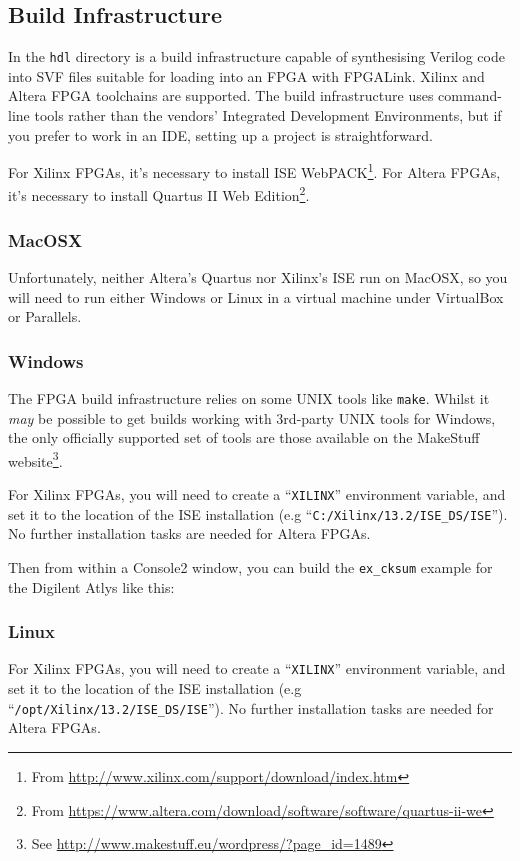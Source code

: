 \subsection{Build Infrastructure}
In the \texttt{hdl} directory is a build infrastructure capable of synthesising Verilog code into SVF files suitable for loading into an FPGA with FPGALink. Xilinx and Altera FPGA toolchains are supported. The build infrastructure uses command-line tools rather than the vendors' Integrated Development Environments, but if you prefer to work in an IDE, setting up a project is straightforward.

For Xilinx FPGAs, it's necessary to install ISE WebPACK\footnote{From \url{http://www.xilinx.com/support/download/index.htm}}. For Altera FPGAs, it's necessary to install Quartus II Web Edition\footnote{From \url{https://www.altera.com/download/software/software/quartus-ii-we}}.

\subsubsection{MacOSX}
Unfortunately, neither Altera's Quartus nor Xilinx's ISE run on MacOSX, so you will need to run either Windows or Linux in a virtual machine under VirtualBox or Parallels.

\subsubsection{Windows}
The FPGA build infrastructure relies on some UNIX tools like \texttt{make}. Whilst it \textit{may} be possible to get builds working with 3rd-party UNIX tools for Windows, the only officially supported set of tools are those available on the MakeStuff website\footnote{See \url{http://www.makestuff.eu/wordpress/?page_id=1489}}.

For Xilinx FPGAs, you will need to create a ``\texttt{XILINX}'' environment variable, and set it to the location of the ISE installation (e.g ``\texttt{C:/Xilinx/13.2/ISE\_DS/ISE}''). No further installation tasks are needed for Altera FPGAs.

\newpage
Then from within a Console2 window, you can build the \texttt{ex\_cksum} example for the Digilent Atlys like this:


\subsubsection{Linux}
For Xilinx FPGAs, you will need to create a ``\texttt{XILINX}'' environment variable, and set it to the location of the ISE installation (e.g ``\texttt{/opt/Xilinx/13.2/ISE\_DS/ISE}''). No further installation tasks are needed for Altera FPGAs.

